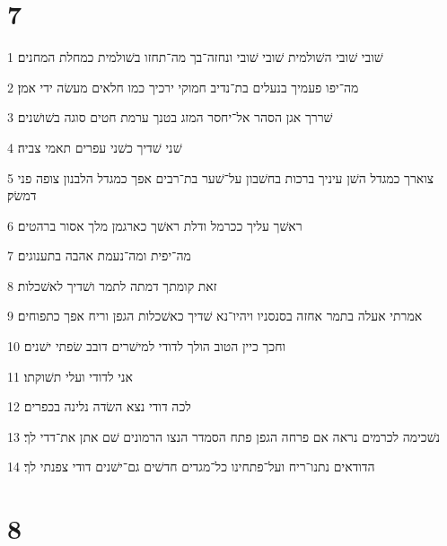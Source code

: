 \chapter{7}

\par 1 שׁובי שׁובי השׁולמית שׁובי שׁובי ונחזה־בך מה־תחזו בשׁולמית כמחלת המחנים׃
\par 2 מה־יפו פעמיך בנעלים בת־נדיב חמוקי ירכיך כמו חלאים מעשׂה ידי אמן׃
\par 3 שׁררך אגן הסהר אל־יחסר המזג בטנך ערמת חטים סוגה בשׁושׁנים׃
\par 4 שׁני שׁדיך כשׁני עפרים תאמי צביה׃
\par 5 צוארך כמגדל השׁן עיניך ברכות בחשׁבון על־שׁער בת־רבים אפך כמגדל הלבנון צופה פני דמשׂק׃
\par 6 ראשׁך עליך ככרמל ודלת ראשׁך כארגמן מלך אסור ברהטים׃
\par 7 מה־יפית ומה־נעמת אהבה בתענוגים׃
\par 8 זאת קומתך דמתה לתמר ושׁדיך לאשׁכלות׃
\par 9 אמרתי אעלה בתמר אחזה בסנסניו ויהיו־נא שׁדיך כאשׁכלות הגפן וריח אפך כתפוחים׃
\par 10 וחכך כיין הטוב הולך לדודי למישׁרים דובב שׂפתי ישׁנים׃
\par 11 אני לדודי ועלי תשׁוקתו׃
\par 12 לכה דודי נצא השׂדה נלינה בכפרים׃
\par 13 נשׁכימה לכרמים נראה אם פרחה הגפן פתח הסמדר הנצו הרמונים שׁם אתן את־דדי לך׃
\par 14 הדודאים נתנו־ריח ועל־פתחינו כל־מגדים חדשׁים גם־ישׁנים דודי צפנתי לך׃

\chapter{8}

